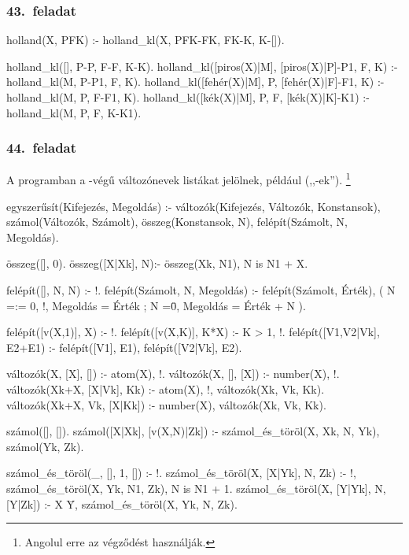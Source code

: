 \subsubsection*{43.~feladat}
\begin{program}
holland(X, PFK) :- holland_kl(X, PFK-FK, FK-K, K-[]).

holland_kl([], P-P, F-F, K-K). 
holland_kl([piros(X)|M], [piros(X)|P]-P1, F, K) :-
    holland_kl(M, P-P1, F, K). 
holland_kl([fehér(X)|M], P, [fehér(X)|F]-F1, K) :-
    holland_kl(M, P, F-F1, K). 
holland_kl([kék(X)|M], P, F, [kék(X)|K]-K1) :-
    holland_kl(M, P, F, K-K1). 
\end{program}
\subsubsection*{44.~feladat}
A programban a -végű változónevek listákat
jelölnek, például  (,,-ek'').%
\footnote{Angolul erre az  végződést
használják.}
\begin{program}
egyszerűsít(Kifejezés, Megoldás) :-
    változók(Kifejezés, Változók, Konstansok),
    számol(Változók, Számolt),
    összeg(Konstansok, N),
    felépít(Számolt, N, Megoldás).

összeg([], 0).
összeg([X|Xk], N):- összeg(Xk, N1), N is N1 + X.

felépít([], N, N) :- !.
felépít(Számolt, N, Megoldás) :-
    felépít(Számolt, Érték),
    ( N =:= 0, !, Megoldás = Érték
    ; N =\= 0, Megoldás = Érték + N
    ).

felépít([v(X,1)], X) :- !.
felépít([v(X,K)], K*X) :- K > 1, !.
felépít([V1,V2|Vk], E2+E1) :-
    felépít([V1], E1),
    felépít([V2|Vk], E2).

változók(X, [X], []) :- atom(X), !.
változók(X, [], [X]) :- number(X), !.
változók(Xk+X, [X|Vk], Kk) :-
    atom(X), !, változók(Xk, Vk, Kk).
változók(Xk+X, Vk, [X|Kk]) :-
    number(X), változók(Xk, Vk, Kk).

számol([], []).
számol([X|Xk], [v(X,N)|Zk]) :-
    számol_és_töröl(X, Xk, N, Yk),
    számol(Yk, Zk).

számol_és_töröl(_, [], 1, []) :- !.
számol_és_töröl(X, [X|Yk], N, Zk) :-
    !, számol_és_töröl(X, Yk, N1, Zk),
    N is N1 + 1.
számol_és_töröl(X, [Y|Yk], N, [Y|Zk]) :-
    X \= Y, számol_és_töröl(X, Yk, N, Zk).
\end{program}
